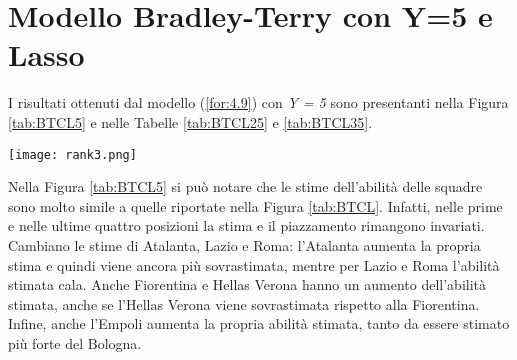 \section{Modello Bradley-Terry con Y=5 e Lasso}
I risultati ottenuti dal modello (\ref{for:4.9}) con \emph{Y = 5} sono presentanti nella Figura \ref{tab:BTCL5} e nelle Tabelle \ref{tab:BTCL25} e \ref{tab:BTCL35}.
\begin{sidewaysfigure} 
	\centering
	\begin{center}
		\texttt{[image: rank3.png]}
		\caption{Barplot che indica per ogni squadra l'abilità stimata dal modello (\ref{for:4.9}) con \emph{Y = 5}. Viene indicato con un asterisco le squadre con un piazzamento stimato diverso da quello reale anche esso riportato a destra del grafico.} \label{tab:BTCL5} 
	\end{center}
\end{sidewaysfigure}
Nella Figura \ref{tab:BTCL5} si può notare che le stime dell'abilità delle squadre sono molto simile a quelle riportate nella Figura \ref{tab:BTCL}. Infatti, nelle prime e nelle ultime quattro posizioni la stima e il piazzamento rimangono invariati. Cambiano le stime di Atalanta, Lazio e Roma: l'Atalanta aumenta la propria stima e quindi viene ancora più sovrastimata, mentre per Lazio e Roma l'abilità stimata cala. Anche Fiorentina e Hellas Verona hanno un aumento dell'abilità stimata, anche se l'Hellas Verona viene sovrastimata rispetto alla Fiorentina. Infine, anche l'Empoli aumenta la propria abilità stimata, tanto da essere stimato più forte del Bologna.\\
